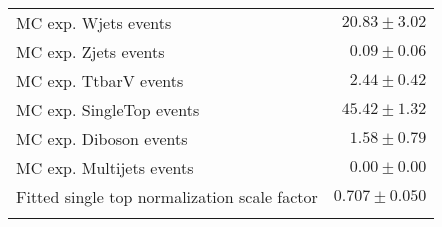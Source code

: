 \begin{table}[h!]
\begin{center}
{\begin{tabular*}{\textwidth}{@{\extracolsep{\fill}}lr}
        MC exp. Wjets events             & $20.83 \pm 3.02$              \\
        MC exp. Zjets events                & $0.09 \pm 0.06$              \\
        MC exp. TtbarV events              & $2.44 \pm 0.42$              \\
        MC exp. SingleTop events            & $45.42 \pm 1.32$              \\
        MC exp. Diboson events                & $1.58 \pm 0.79$              \\
        MC exp. Multijets events             & $0.00 \pm 0.00$              \\
\noalign{\smallskip}\hline\noalign{\smallskip}
Fitted single top normalization scale factor & $0.707 \pm 0.050$ \\
\noalign{\smallskip}\hline\noalign{\smallskip}
\end{tabular*}
}
\end{center}
\end{table}
%